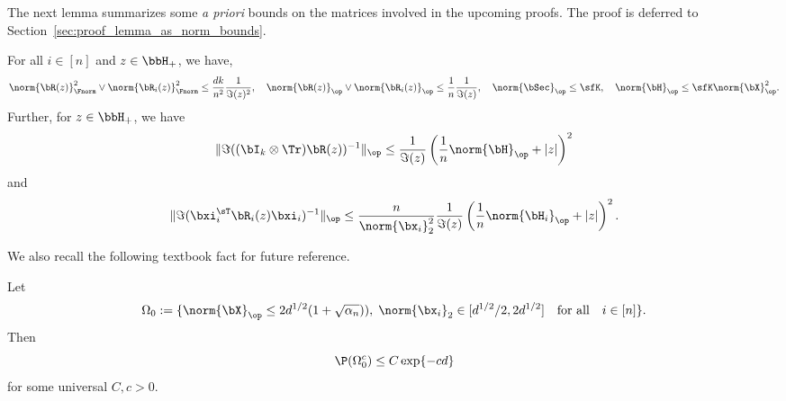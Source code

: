  The next lemma summarizes some \emph{a priori} bounds on the matrices
involved in the upcoming proofs.
The proof is deferred to Section~\ref{sec:proof_lemma_as_norm_bounds}.
%
\begin{lemma}
\label{lemma:as_norm_bounds}
For all $i\in[n]$ and $z\in\bbH_+$, we have, 
\begin{align}
\label{eq:det_norm_bound_lemma_eq123}
     \norm{\bR(z)}_\Fnorm^2 \vee \norm{\bR_i(z)}_\Fnorm^2 \le \frac{dk}{n^2} \frac{1}{\Im(z)^2},
     \quad
  \norm{\bR(z)}_\op \vee\norm{\bR_i(z)}_\op  \le  \frac{1}{n} \frac1{\Im(z)},
  \quad
  \norm{\bSec}_\op \le \sfK,
   \quad
   \norm{\bH}_\op \le \sfK \norm{\bX}_\op^2.
\end{align}
Further, for $z \in\bbH_+$, we have
\begin{equation}
\label{eq:det_norm_bound_lemma_eq4}
    \|\Im((\bI_k\otimes\Tr)\bR(z))^{-1}\|_\op 
    \le   \frac{1}{\Im(z)} \left(\frac{1}{n}\norm{\bH}_\op  + |z|\right)^2
\end{equation}
and
\begin{equation}
\label{eq:det_norm_bound_lemma_eq5}
    \|\Im(\bxi_i^\sT\bR_i(z)\bxi_i)^{-1}\|_\op \le \frac{n}{\norm{\bx_i}_2^2} \frac{1}{\Im(z)} \left(\frac{1}{n}\norm{\bH_i}_\op  + |z|\right)^2.
\end{equation}
\end{lemma}
%

We also recall the following textbook fact 
for future reference.
\begin{lemma}
\label{lemma:standard_norm_bounds}
 Let
 $$\Omega_0 := \{\norm{\bX}_\op \le 2 d^{1/2}(1 + \sqrt{\alpha_n})),\; \norm{\bx_i}_2 \in [d^{1/2}/{2}, 2d^{1/2}] \quad\textrm{for all}\quad i\in[n]\}.$$
Then 
\begin{equation}
    \P(\Omega_0^c ) \le C \exp\{- c d\}
\end{equation}
for some universal $C,c>0$.
\end{lemma}

